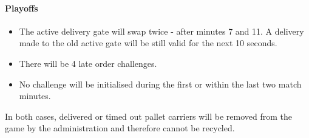 \documentclass[12pt,twoside]{article}
\begin{document}
\paragraph{Playoffs}
\begin{itemize}
\item The active delivery gate will swap twice - after minutes 7
  and 11. A delivery made to the old active gate will be still
  valid for the next 10 seconds.
\item There will be 4 late order challenges. 
\item No challenge will be initialised during the first or within
  the last two match minutes.
\end{itemize}    


In both cases, delivered or timed out pallet carriers will be removed
from the game by the administration and therefore cannot be recycled.
\end{document}
